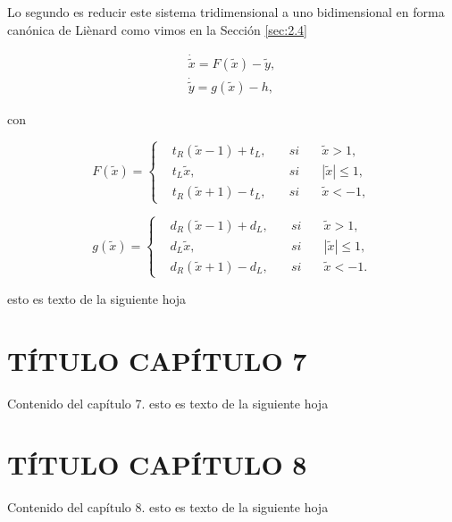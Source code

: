 \documentclass[12pt,a4paper]{report} %
\begin{document}
	
	
	\newpage
	
	\vspace{0.5cm}Lo segundo es reducir este sistema tridimensional a uno bidimensional en forma canónica de Liènard como vimos en la Sección \ref{sec:2.4}
	
	\begin{equation}
		\tag{2.42}
		\begin{gathered}
			\dot{\tilde{x}}=F(\tilde{x})-\tilde{y}, \\[2mm]
			\dot{\tilde{y}}=g(\tilde{x})-h,
		\end{gathered}
	\end{equation}
	
	con
	
	\begin{equation}
		\tag{2.43}
		F(\tilde{x})=
		\left\{
		\begin{aligned}
			&t_R(\tilde{x}-1)+t_L, \quad &si& \quad \tilde{x}>1,\\
			&t_L\tilde{x}, &si& \quad |\tilde{x}|\leq 1,\\
			&t_R(\tilde{x}+1)-t_L, \quad &si& \quad \tilde{x}<-1,
		\end{aligned}
		\right.
	\end{equation}\smallskip
	
	\begin{equation}
		\tag{2.44}
		g(\tilde{x})=
		\left\{
		\begin{aligned}
			&d_R(\tilde{x}-1)+d_L, \quad &si& \quad \tilde{x}>1,\\
			&d_L\tilde{x}, &si& \quad |\tilde{x}|\leq 1,\\
			&d_R(\tilde{x}+1)-d_L, \quad &si& \quad \tilde{x}<-1.
		\end{aligned}
		\right.
	\end{equation}\smallskip
	
	
	
	\newpage
	esto es texto de la siguiente hoja
	
	\chapter{TÍTULO CAPÍTULO 7}
	Contenido del capítulo 7.
	\newpage
	esto es texto de la siguiente hoja
	
	\chapter{TÍTULO CAPÍTULO 8}
	Contenido del capítulo 8.
	\newpage
	esto es texto de la siguiente hoja
	
\end{document}
